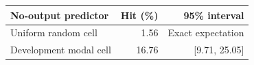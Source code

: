 \begin{tabular}{lrr}
\toprule
No-output predictor & Hit (\%) & 95\% interval \\
\midrule
Uniform random cell & 1.56 & Exact expectation \\
Development modal cell & 16.76 & [9.71, 25.05] \\
\bottomrule
\end{tabular}
